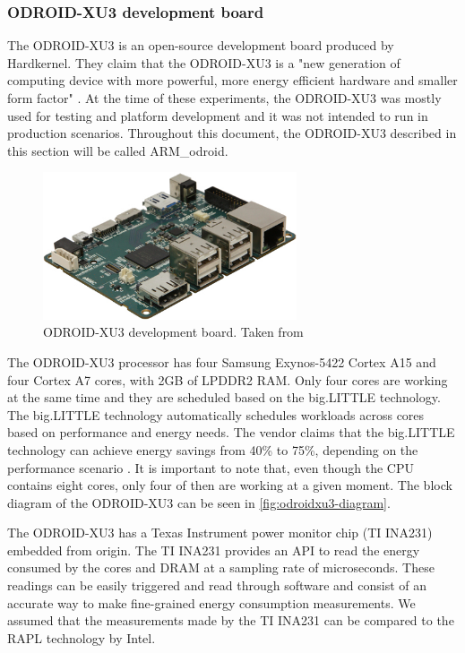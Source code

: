 \subsubsection{ODROID-XU3 development board}

The ODROID-XU3 \cite{ODROID_XU3} is an open-source development board produced by
 Hardkernel. They claim that the ODROID-XU3 is a "new generation of computing device
with more powerful, more energy efficient hardware and smaller form factor"
\cite{ODROID_XU3}. At the time of these experiments, the ODROID-XU3 was  mostly used for testing and platform development and it was not intended to run in production scenarios. Throughout this document, the ODROID-XU3 described in this section will be called ARM\_odroid.


 \begin{figure}[h!]
  \centering
    \includegraphics[width=75mm]{"img/odroid"}
    \caption{ODROID-XU3 development board. Taken from \cite{ODROID_XU3}}
    \label{fig:odroid}
\end{figure}


The ODROID-XU3 processor has four Samsung Exynos-5422 Cortex A15 and four Cortex A7 cores,
with 2GB of LPDDR2 RAM. Only four cores are working at the same time and they are 
scheduled based on the big.LITTLE technology. The big.LITTLE technology
\cite{biglittle} automatically schedules workloads across cores based on
performance and energy needs. The vendor claims that the big.LITTLE technology
can achieve energy savings from 40\% to 
75\%, depending on the performance scenario \cite{biglittle}.
It is important to note that, even though the CPU contains eight cores, only four of then are working at a
given moment. The block diagram of the ODROID-XU3 can be seen in 
\ref{fig:odroidxu3-diagram}.


The ODROID-XU3 has a Texas Instrument power monitor chip (TI INA231) embedded
from origin. The TI INA231 provides an API to read the energy consumed by the 
cores and DRAM at a sampling rate of microseconds. These readings can be easily triggered and read
through software and consist of an accurate way to make fine-grained energy
consumption measurements. We assumed that the measurements made by the TI INA231 can 
be compared to the RAPL technology by Intel.


